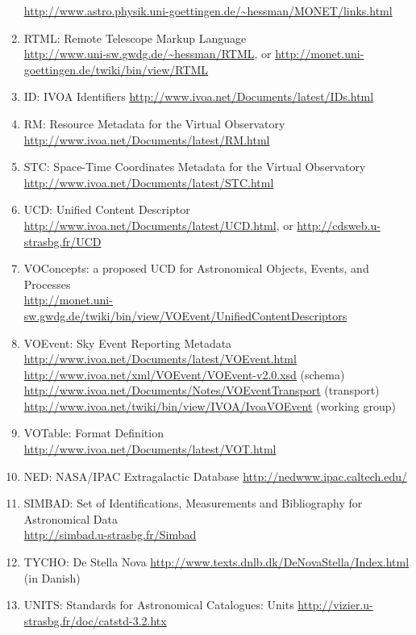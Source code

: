 \documentclass[11pt,a4paper]{ivoa}
\begin{document}
\begin{enumerate}
\url{http://www.astro.physik.uni-goettingen.de/~hessman/MONET/links.html}
\item\label{bib14} RTML: Remote Telescope Markup Language\\
\url{http://www.uni-sw.gwdg.de/~hessman/RTML}, or \url{http://monet.uni-goettingen.de/twiki/bin/view/RTML}
\item\label{bib15} ID: IVOA Identifiers \url{http://www.ivoa.net/Documents/latest/IDs.html}
\item\label{bib16} RM: Resource Metadata for the Virtual Observatory \url{http://www.ivoa.net/Documents/latest/RM.html}
\item\label{bib17} STC: Space-Time Coordinates Metadata for the Virtual Observatory \url{http://www.ivoa.net/Documents/latest/STC.html} 
\item\label{bib18} UCD: Unified Content Descriptor \\
\url{http://www.ivoa.net/Documents/latest/UCD.html}, or \url{http://cdsweb.u-strasbg.fr/UCD}
\item\label{bib19} VOConcepts: a proposed UCD for Astronomical Objects, Events, and Processes \\
\url{http://monet.uni-sw.gwdg.de/twiki/bin/view/VOEvent/UnifiedContentDescriptors} 
\item\label{bib20} VOEvent: Sky Event Reporting Metadata\\
\url{http://www.ivoa.net/Documents/latest/VOEvent.html}\\
\url{http://www.ivoa.net/xml/VOEvent/VOEvent-v2.0.xsd} (schema)\\
\url{http://www.ivoa.net/Documents/Notes/VOEventTransport} (transport)\\
\url{http://www.ivoa.net/twiki/bin/view/IVOA/IvoaVOEvent} (working group)
\item\label{bib21} VOTable: Format Definition\\
\url{http://www.ivoa.net/Documents/latest/VOT.html} 
\item\label{bib22} NED: NASA/IPAC Extragalactic Database \url{http://nedwww.ipac.caltech.edu/}
\item\label{bib23} SIMBAD: Set of Identifications, Measurements and Bibliography for Astronomical Data\\
\url{http://simbad.u-strasbg.fr/Simbad}
\item\label{bib24} TYCHO: De Stella Nova \url{http://www.texts.dnlb.dk/DeNovaStella/Index.html} (in Danish) 
\item\label{bib25} UNITS: Standards for Astronomical Catalogues: Units \url{http://vizier.u-strasbg.fr/doc/catstd-3.2.htx}

\end{enumerate}
\end{document}
